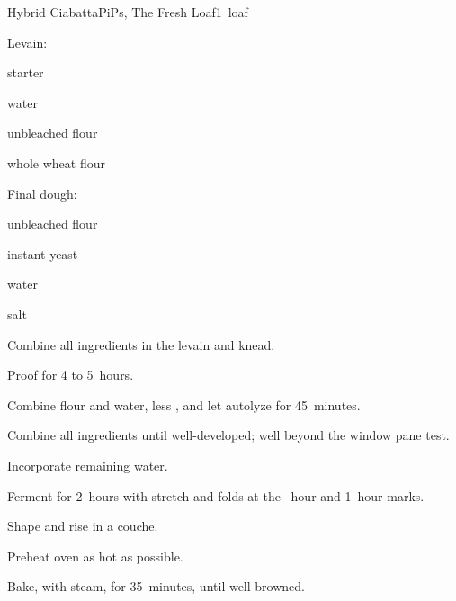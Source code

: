 \begin{recipe}{Hybrid Ciabatta}{PiPs, The Fresh Loaf}{1~loaf}

Levain:
\begin{ingredients}
\item {} starter
\item {} water
\item {} unbleached flour
\item {} whole wheat flour
\end{ingredients}

Final dough:
\begin{ingredients}
\item {} unbleached flour
\item {} instant yeast
\item {} water
\item {} salt
\end{ingredients}

\begin{directions}
\item Combine all ingredients in the levain and knead.
\item Proof for 4 to 5~hours.
\item Combine flour and water, less , and let autolyze for 45~minutes.
\item Combine all ingredients until well-developed; well beyond the window pane test.
\item Incorporate remaining water.
\item Ferment for 2\half~hours with stretch-and-folds at the \half~hour and 1~hour marks.
\item Shape and rise in a couche.
\item Preheat oven as hot as possible.
\item Bake, with steam, for 35~minutes, until well-browned.
\end{directions}

\end{recipe}

